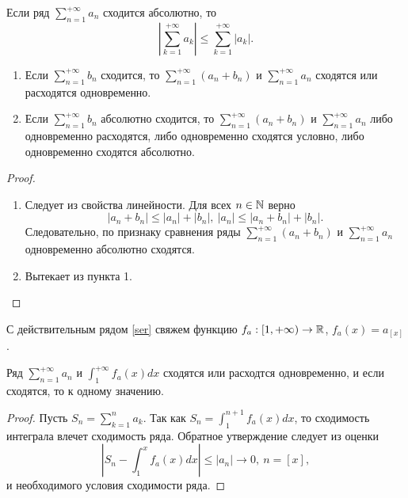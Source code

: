 \begin{note}
    Если ряд $\sum_{n = 1}^{+\infty}a_{n}$ сходится абсолютно, то
    \[\left|\sum_{k = 1}^{+\infty} a_{k}\right| \leq \sum_{k = 1}^{+\infty}|a_{k}|.\]
\end{note}

\begin{lemma}
    \begin{enumerate}
        \item Если $\sum_{n = 1}^{+\infty} b_{n}$ сходится, то $\sum_{n = 1}^{+\infty} (a_{n} + b_{n})$ и $\sum_{n = 1}^{+\infty} a_{n}$ сходятся или расходятся одновременно.
        \item Если $\sum_{n = 1}^{+\infty} b_{n}$ абсолютно сходится, то $\sum_{n = 1}^{+\infty} (a_{n} + b_{n})$ и $\sum_{n = 1}^{+\infty} a_{n}$ либо одновременно расходятся, либо одновременно сходятся условно, либо одновременно сходятся абсолютно.
    \end{enumerate}
\end{lemma}

\begin{proof}~

    \begin{enumerate}
        \item Следует из свойства линейности. Для всех $n \in \mathbb{N}$ верно
        \[|a_{n} + b_{n}| \leq |a_{n}| + |b_{n}|, \ |a_{n}| \leq |a_{n} + b_{n}| + |b_{n}|.\]
        Следовательно, по признаку сравнения ряды $\sum_{n = 1}^{+\infty} (a_{n} + b_{n})$ и $\sum_{n = 1}^{+\infty} a_{n}$ одновременно абсолютно сходятся.
        
        \item Вытекает из пункта 1.
    \end{enumerate}
    
\end{proof}

\begin{definition}
    С действительным рядом \ref{ser} свяжем функцию $f_{a}: [1, +\infty) \to \mathbb{R}$, $f_{a}(x) = a_{[x]}$.
\end{definition}

\begin{lemma}
    \label{lem2.5}
    Ряд $\sum_{n = 1}^{+\infty}a_{n}$ и $\int_{1}^{+\infty}f_{a}(x)dx$ сходятся или расходтся одновременно, и если сходятся, то к одному значению.
\end{lemma}

\begin{proof}
    Пусть $S_{n} = \sum_{k = 1}^{n} a_{k}$. Так как $S_{n} = \int_{1}^{n + 1}f_{a}(x) dx$, то сходимость интеграла влечет сходимость ряда. Обратное утверждение следует из оценки 
    \[\left| S_{n} - \int_{1}^{x} f_{a}(x) dx \right| \leq |a_{n}| \to 0, \ n = [x],\]
    и необходимого условия сходимости ряда.
\end{proof}

